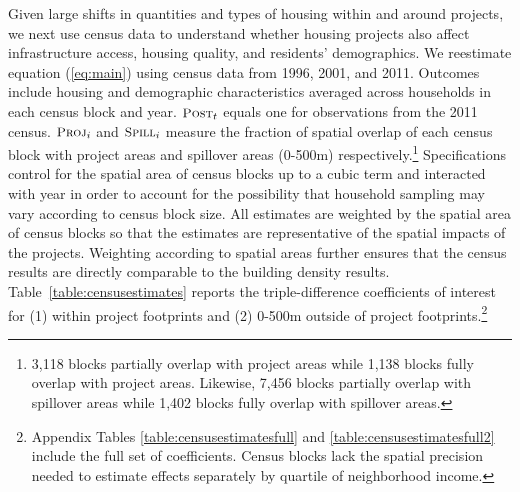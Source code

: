 \documentclass[12pt]{article}
\begin{document}
Given large shifts in quantities and types of housing within and around projects, we next use census data to understand whether housing projects also affect infrastructure access, housing quality, and residents' demographics.  We reestimate equation (\ref{eq:main}) using census data from 1996, 2001, and 2011.  Outcomes include housing and demographic characteristics averaged across households in each census block and year.  $\textsc{\small Post}_{t}$ equals one for observations from the 2011 census.  $\textsc{\small Proj}_{i}$ and $\textsc{\small Spill}_{i}$ measure the fraction of spatial overlap of each census block with project areas and spillover areas (0-500m) respectively.\footnote{3,118 blocks partially overlap with project areas while 1,138 blocks fully overlap with project areas.  Likewise, 7,456 blocks partially overlap with spillover areas while 1,402 blocks fully overlap with spillover areas.}  Specifications control for the spatial area of census blocks up to a cubic term and interacted with year in order to account for the possibility that household sampling may vary according to census block size.  All estimates are weighted by the spatial area of census blocks so that the estimates are representative of the spatial impacts of the projects.  Weighting according to spatial areas further ensures that the census results are directly comparable to the building density results.  Table~\ref{table:censusestimates} reports the triple-difference coefficients of interest for (1) within project footprints and (2) 0-500m outside of project footprints.\footnote{Appendix Tables \ref{table:censusestimatesfull} and \ref{table:censusestimatesfull2} include the full set of coefficients.  Census blocks lack the spatial precision needed to estimate effects separately by quartile of neighborhood income.}  

\end{document}
